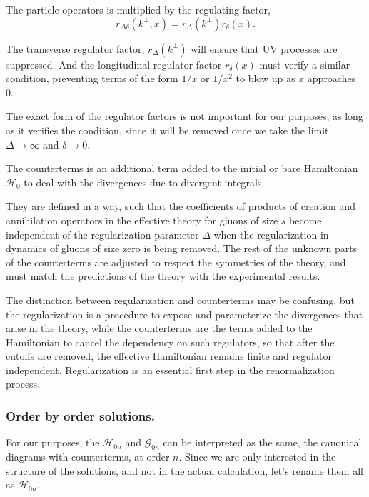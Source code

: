 \documentclass[11pt,a4paper,twoside,pdf]{article}
\numberwithin{equation}{section}
\begin{document}
The particle operators is multiplied by the regulating factor, 
\begin{equation}
    r_{\Delta \delta} (k^\perp, x) = r_\Delta (k^\perp) r_\delta(x).
\end{equation}

The transverse regulator factor, $r_\Delta (k^\perp)$ will ensure that UV processes are suppressed.
And the longitudinal regulator factor $r_\delta(x)$ must verify a similar condition, preventing terms
of the form $1/x$ or $1/x^2$ to blow up as $x$ approaches 0. 

The exact form of the regulator factors is not important for our purposes, as long as it 
verifies the condition, since it will be removed once we take the
limit $\Delta \to \infty$ and $\delta \to 0$.

The counterterms is an additional term added to the initial or bare Hamiltonian 
$\mathcal{H}_0$ to deal with the divergences due to divergent integrals. 

They are defined in a way, such that the coefficients of products 
of creation and annihilation operators in the effective theory for gluons of size $s$
become independent of the regularization parameter $\Delta$ when the regularization
in dynamics of gluons of size zero is being removed. The rest of the unknown parts 
of the counterterms are adjusted to respect the symmetries of the theory, and must 
match the predictions of the theory with the experimental results.

The distinction between regularization and counterterms may be confusing, but the
regularization is a procedure to expose and parameterize the divergences that arise
in the theory, while the counterterms are the terms added to the Hamiltonian to 
cancel the dependency on such regulators, so that after the cutoffs are removed, the 
effective Hamiltonian remains finite and regulator independent. Regularization is
an essential first step in the renormalization process.

\subsubsection{Order by order solutions.} \label{sec:orderbyorder_solutions}

For our purposes, the $\mathcal{H}_{0 n}$ and $\mathcal{G}_{0 n}$ can be interpreted as the
same, the canonical diagrams with counterterms, at order \( n \). Since we are only
interested in the structure of the solutions, and not in the actual calculation, let's 
rename them all as $\mathcal{H}_{0 n}$.
\end{document}
